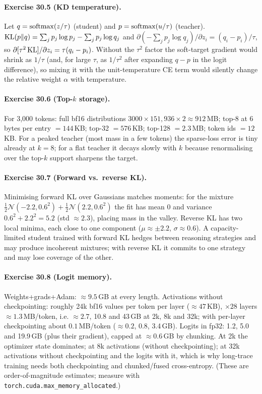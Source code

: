 \paragraph{Exercise 30.5 (KD temperature).}
Let $q=\operatorname{softmax}(z/\tau)$ (student) and $p=\operatorname{softmax}(u/\tau)$ (teacher). $\operatorname{KL}(p\|q)=\sum_j p_j\log
p_j-\sum_jp_j\log q_j$ and $\partial(-\sum_j p_j\log q_j)/\partial z_i=(q_i-p_i)/\tau$, so
$\partial[\tau^2\operatorname{KL}]/\partial z_i=\tau(q_i-p_i)$. Without the $\tau^2$ factor the soft-target
gradient would shrink as $1/\tau$ (and, for large $\tau$, as $1/\tau^2$ after expanding $q-p$ in
the logit difference), so mixing it with the unit-temperature CE term would silently change the
relative weight $\alpha$ with temperature.

\paragraph{Exercise 30.6 (Top-$k$ storage).}
For 3{,}000 tokens: full bf16 distributions $3000\times151{,}936\times2\approx912$\,MB; top-8 at 6
bytes per entry $=144$\,KB; top-32 $=576$\,KB; top-128 $=2.3$\,MB; token ids $=12$\,KB. For a peaked
teacher (most mass in a few tokens) the sparse-loss error is tiny already at $k=8$; for a flat
teacher it decays slowly with $k$ because renormalising over the top-$k$ support sharpens the
target.

\paragraph{Exercise 30.7 (Forward vs.\ reverse KL).}
Minimising forward KL over Gaussians matches moments: for the mixture $\tfrac12\mathcal N(-2.2,0.6^2)
+\tfrac12\mathcal N(2.2,0.6^2)$ the fit has mean 0 and variance $0.6^2+2.2^2=5.2$ (std $\approx2.3$),
placing mass in the valley. Reverse KL has two local minima, each close to one component
($\mu\approx\pm2.2$, $\sigma\approx0.6$). A capacity-limited student trained with forward KL
hedges between reasoning strategies and may produce incoherent mixtures; with reverse KL it commits
to one strategy and may lose coverage of the other.

\paragraph{Exercise 30.8 (Logit memory).}
Weights+grads+Adam: $\approx9.5$\,GB at every length. Activations without checkpointing: roughly 24k
bf16 values per token per layer ($\approx47$\,KB), $\times28$ layers $\approx1.3$\,MB/token, i.e.
$\approx2.7$, 10.8 and 43\,GB at 2k, 8k and 32k; with per-layer checkpointing about
$0.1$\,MB/token ($\approx0.2$, 0.8, 3.4\,GB). Logits in fp32: 1.2, 5.0 and 19.9\,GB (plus their
gradient), capped at $\approx0.6$\,GB by chunking. At 2k the optimizer state dominates; at 8k
activations (without checkpointing); at 32k activations without checkpointing and the logits with it,
which is why long-trace training needs both checkpointing and chunked/fused cross-entropy.
(These are order-of-magnitude estimates; measure with \texttt{torch.cuda.max\_memory\_allocated}.)


